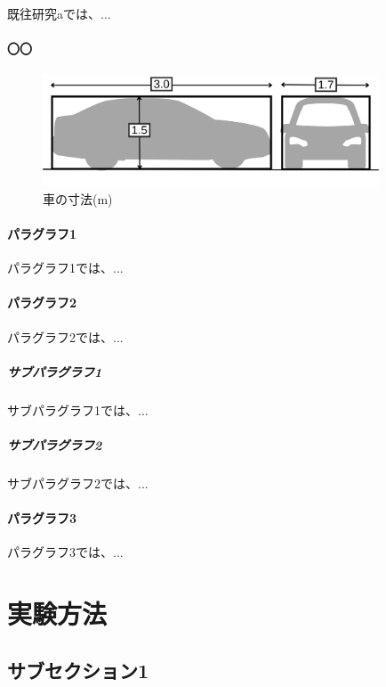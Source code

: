 \documentclass[12pt]{jsarticle}
\begin{document}
  既往研究aでは、...

  \paragraph{〇〇}

  \begin{figure}[H]
    \begin{center}
      \includegraphics[width=10cm]{images/car_design.png}
    \end{center}
    \caption{
      車の寸法(m)
    }
    \label{fig:previous1_site_map}
  \end{figure}

  \paragraph{パラグラフ1}

  パラグラフ1では、...

  \paragraph{パラグラフ2}

  パラグラフ2では、...\\

  \subparagraph{サブパラグラフ1}

  サブパラグラフ1では、...

  \subparagraph{サブパラグラフ2}

  サブパラグラフ2では、...

  \paragraph{パラグラフ3}

  パラグラフ3では、...

  \section{実験方法}

  \subsection{サブセクション1}
\end{document}
